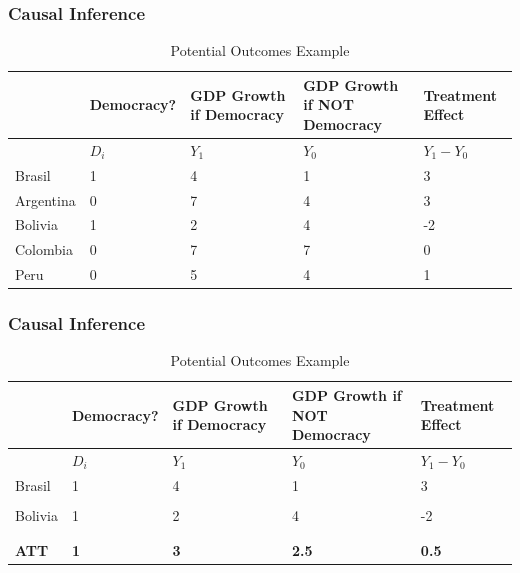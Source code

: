 \documentclass[xcolor=x11names,compress]{beamer}\usepackage[]{graphicx}\usepackage[]{color}
\renewcommand{\(}{\begin{columns}}
\renewcommand{\)}{\end{columns}}
\newcommand{\<}[1]{\begin{column}{#1}}
\renewcommand{\>}{\end{column}}
\begin{document}
\begin{frame}
\frametitle{Causal Inference}
\footnotesize
\begin{table}[htbp]
  \centering
  \caption{Potential Outcomes Example}
    \begin{tabular}{|p{1.8cm}|p{1.8cm}|p{2cm}|p{2cm}|p{2cm}|}
    \hline
          & \multicolumn{1}{p{1.8cm}|}{Democracy?} & \multicolumn{1}{p{2cm}|}{GDP Growth if Democracy} & \multicolumn{1}{p{2.2cm}|}{GDP Growth if NOT Democracy} &  Treatment Effect \bigstrut\\
    \hline
          & \multicolumn{1}{p{1.8cm}|}{$D_i$} & \multicolumn{1}{p{2cm}|}{$Y_1$} & \multicolumn{1}{p{2.2cm}|}{$Y_0$} & \multicolumn{1}{p{1.8cm}|}{$Y_{1} - Y_{0}$} \bigstrut\\
    \hline
    Brasil & 1 & 4     & 1      & 3 \bigstrut\\
    \hline
    Argentina & 0 & 7    & 4      & 3 \bigstrut\\
    \hline
    Bolivia & 1 & 2     & 4     & -2 \bigstrut\\
    \hline
    Colombia & 0 &  7   & 7    & 0 \bigstrut\\
    \hline
    Peru & 0 & 5     & 4     & 1 \bigstrut\\
\hline
    \end{tabular}%
  \label{tab:addlabel}%
\end{table}%
\normalsize
\end{frame}

\begin{frame}
\frametitle{Causal Inference}
\footnotesize
\begin{table}[htbp]
  \centering
  \caption{Potential Outcomes Example}
    \begin{tabular}{|p{1.8cm}|p{1.8cm}|p{2cm}|p{2cm}|p{2cm}|}
    \hline
          & \multicolumn{1}{p{1.8cm}|}{Democracy?} & \multicolumn{1}{p{2cm}|}{GDP Growth if Democracy} & \multicolumn{1}{p{2.2cm}|}{GDP Growth if NOT Democracy} &  Treatment Effect \bigstrut\\
    \hline
          & \multicolumn{1}{p{1.8cm}|}{$D_i$} & \multicolumn{1}{p{2cm}|}{$Y_1$} & \multicolumn{1}{p{2.2cm}|}{$Y_0$} & \multicolumn{1}{p{1.8cm}|}{$Y_{1} - Y_{0}$} \bigstrut\\
    \hline
    Brasil & 1 & 4     & 1      & 3 \bigstrut\\
    \hline
     &  &     &       &  \bigstrut\\[-2ex]
    \hline
    Bolivia & 1 & 2     & 4     & -2 \bigstrut\\
    \hline
     &  &     &     &  \bigstrut\\[-2ex]
    \hline
     &  &      &      &  \bigstrut\\[-2ex]
    \hline
    \textbf{ATT} & \textbf{1} & \textbf{3}     & \textbf{2.5}     & \textbf{0.5} \bigstrut\\
\hline
    \end{tabular}%
  \label{tab:addlabel}%
\end{table}%
\normalsize
\end{frame}
\end{document}
